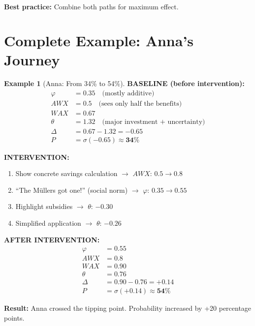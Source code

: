 \documentclass[11pt,a4paper]{book}
\theoremstyle{definition}
\newtheorem{example}{Example}[section]
\theoremstyle{remark}
\begin{document}
\textbf{Best practice:} Combine both paths for maximum effect.

\section{Complete Example: Anna's Journey}
\label{sec:12-anna}

\begin{example}[Anna: From 34\% to 54\%]

\textbf{BASELINE (before intervention):}
\begin{align*}
\varphi &= 0.35 \quad \text{(mostly additive)}\\
AWX &= 0.5 \quad \text{(sees only half the benefits)}\\
WAX &= 0.67\\
\theta &= 1.32 \quad \text{(major investment + uncertainty)}\\
\Delta &= 0.67 - 1.32 = \mathbf{-0.65}\\
P &= \sigma(-0.65) \approx \mathbf{34\%}
\end{align*}

\textbf{INTERVENTION:}
\begin{enumerate}
\item Show concrete savings calculation $\rightarrow$ $AWX$: $0.5 \to 0.8$
\item ``The Müllers got one!'' (social norm) $\rightarrow$ $\varphi$: $0.35 \to 0.55$
\item Highlight subsidies $\rightarrow$ $\theta$: $-0.30$
\item Simplified application $\rightarrow$ $\theta$: $-0.26$
\end{enumerate}

\textbf{AFTER INTERVENTION:}
\begin{align*}
\varphi &= 0.55\\
AWX &= 0.8\\
WAX &= 0.90\\
\theta &= 0.76\\
\Delta &= 0.90 - 0.76 = \mathbf{+0.14}\\
P &= \sigma(+0.14) \approx \mathbf{54\%}
\end{align*}

\textbf{Result:} Anna crossed the tipping point. Probability increased by +20 percentage points.
\end{example}
\end{document}
